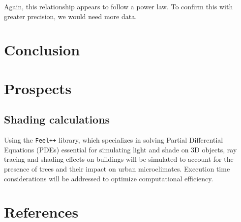 \documentclass[12pt]{article}
\begin{document}
Again, this relationship appears to follow a power law. To confirm this with
greater precision, we would need more data.

\newpage

\section{Conclusion}

\newpage

\section{Prospects}

\subsection{Shading calculations}
Using the \texttt{Feel++}\cite{feel++} library, which specializes in solving Partial
Differential Equations (PDEs) essential for simulating light and shade on 3D
objects, ray tracing and shading effects on buildings will be
simulated to account for the presence of trees and their impact on urban
microclimates. Execution time considerations will be addressed to optimize
computational efficiency.

\newpage

\section{References}


\end{document}
